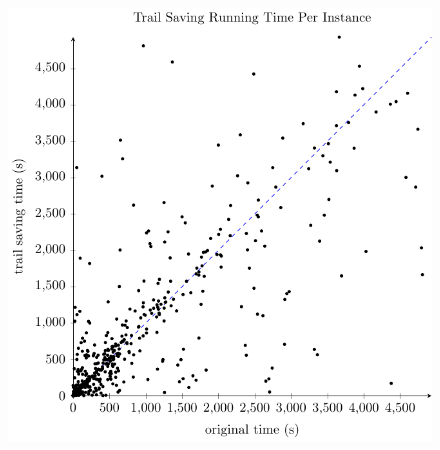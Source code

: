 \documentclass{article}
\begin{document}
\begin{figure}\includegraphics[scale=0.8]{test2.pdf}\caption{}\end{figure}

\clearpage
\end{document}
